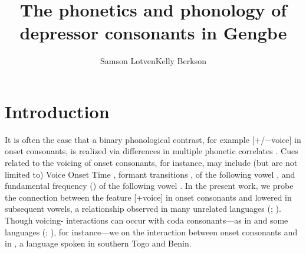 \documentclass[output=paper,newtxmath,modfonts,nonflat]{langsci/langscibook}
\author{Samson Lotven\affiliation{Indiana University Bloomington}\lastand Kelly Berkson\affiliation{Indiana University Bloomington} }
\title{The phonetics and phonology of depressor consonants in Gengbe}
\begin{document}
\maketitle
 \newcommand{\nocaption}[1]{{\color{red} Please provide a caption}}
 

 

 

 

 

 

\section{Introduction}\label{sec:lotven:1}
It is often the case that a binary phonological contrast, for example [+/−voice] in onset consonants, is realized via differences in multiple phonetic correlates \citep{wright2004}. Cues related to the voicing of onset consonants, for instance, may include (but are not limited to) Voice Onset Time \citep{Lisker1964}, formant transitions \citep{Stevens1973},  of the following vowel \citep{Chistovich1969}, and fundamental frequency ()  of the following vowel \citep{Shimizu1989}. In the present work, we probe the connection between the feature [+voice] in onset consonants and lowered  in subsequent vowels, a relationship observed in many unrelated languages (\citealt{Bradshaw1999}; \citealt{Tang2008}). Though voicing- interactions can occur with coda consonants—as in  and some  languages (\citealt{Maran1973}; \citealt{Matisoff1973}), for instance—we  on the interaction between onset consonants and  in , a  language spoken in southern Togo and Benin.
\end{document}
